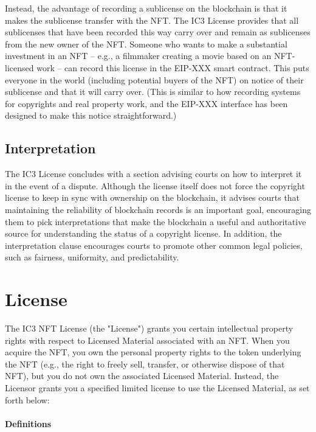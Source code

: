 \documentclass{article}
\begin{document}
Instead, the advantage of recording a sublicense on the blockchain is that it makes the sublicense transfer with the NFT. The IC3 License provides that all sublicenses that have been recorded this way carry over and remain as sublicenses from the new owner of the NFT. Someone who wants to make a substantial investment in an NFT -- e.g., a filmmaker creating a movie based on an NFT-licensed work -- can record this license in the EIP-XXX smart contract. This puts everyone in the world (including potential buyers of the NFT) on notice of their sublicense and that it will carry over. (This is similar to how recording systems for copyrights and real property work, and the EIP-XXX interface has been designed to make this notice straightforward.)   


\subsection{Interpretation}

The IC3 License concludes with a section advising courts on how to interpret it in the event of a dispute. Although the license itself does not force the copyright license to keep in sync with ownership on the blockchain, it advises courts that maintaining the reliability of blockchain records is an important goal, encouraging them to pick interpretations that make the blockchain a useful and authoritative source for understanding the status of a copyright license. In addition, the interpretation clause encourages courts to promote other common legal policies, such as fairness, uniformity, and predictability.





\section{License}

The IC3 NFT License (the "License") grants you certain intellectual property rights with respect to Licensed Material associated with an NFT. When you acquire the NFT, you own the personal property rights to the token underlying the NFT (e.g., the right to freely sell, transfer, or otherwise dispose of that  NFT), but you do not own the associated Licensed Material. Instead, the Licensor grants you a specified limited license to use the Licensed Material, as set forth below:





\paragraph{Definitions}
\end{document}
